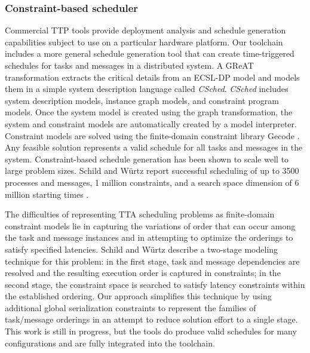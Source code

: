 \subsubsection*{Constraint-based scheduler}
Commercial TTP tools provide deployment analysis and schedule generation capabilities subject to use on a particular hardware platform.  Our toolchain includes a more general schedule generation tool that can create time-triggered schedules for tasks and messages in a distributed system.  A GReAT transformation extracts the critical details from an ECSL-DP model and models them in a simple system description language called \emph{CSched}.  \emph{CSched} includes system description models, instance graph models, and constraint program models.  Once the system model is created using the graph transformation, the system and constraint models are automatically created by a model interpreter.  Constraint models are solved using the finite-domain constraint library Gecode \cite{gecode}.  Any feasible solution represents a valid schedule for all tasks and messages in the system. Constraint-based schedule generation has been shown to scale well to large problem sizes.  Schild and W\"urtz report successful scheduling of up to 3500 processes and messages, 1 million constraints, and a search space dimension of 6 million starting times \cite{sw:offlinescheduling}.

The difficulties of representing TTA scheduling problems as finite-domain constraint models lie in capturing the variations of order that can occur among the task and message instances and in attempting to optimize the orderings to satisfy specified latencies.  Schild and W\"urtz \cite{sw:offlinescheduling} describe a two-stage modeling technique for this problem: in the first stage, task and message dependencies are resolved and the resulting execution order is captured in constraints; in the second stage, the constraint space is searched to satisfy latency constraints within the established ordering.  Our approach simplifies this technique by using additional global serialization constraints to represent the families of task/message orderings in an attempt to reduce solution effort to a single stage.  This work is still in progress, but the tools do produce valid schedules for many configurations and are fully integrated into the toolchain.

